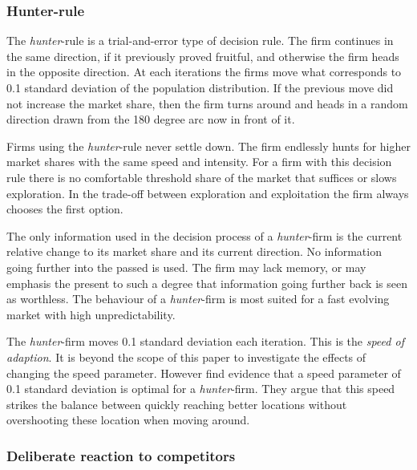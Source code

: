 \documentclass[preprint, 12pt]{elsarticle}
\begin{document}
\subsubsection{Hunter-rule}

The \emph{hunter}-rule is a trial-and-error type of decision rule. The firm continues in the same direction, if it previously proved fruitful, and otherwise the firm heads in the opposite direction. At each iterations the firms move what corresponds to 0.1 standard deviation of the population distribution. If the previous move did not increase the market share, then the firm turns around and heads in a random direction drawn from the 180 degree arc now in front of it. 

Firms using the \emph{hunter}-rule never settle down. The firm endlessly hunts for higher market shares with the same speed and intensity. For a firm with this decision rule there is no comfortable threshold share of the market that suffices or slows exploration. In the trade-off between exploration and exploitation the firm always chooses the first option. 

The only information used in the decision process of a \emph{hunter}-firm is the current relative change to its market share and its current direction. No information going further into the passed is used. The firm may lack memory, or may emphasis the present to such a degree that information going further back is seen as worthless. The behaviour of a \emph{hunter}-firm is most suited for a fast evolving market with high unpredictability.

The \emph{hunter}-firm moves 0.1 standard deviation each iteration. This is the \emph{speed of adaption}. It is beyond the scope of this paper to investigate the effects of changing the speed parameter. However \citet[chapter~7, pp.~150-151]{Laver_Sergenti_2011} find evidence that a speed parameter of 0.1 standard deviation is optimal for a \emph{hunter}-firm. They argue that this speed strikes the balance between quickly reaching better locations without overshooting these location when moving around. 

\subsubsection{Deliberate reaction to competitors}
\end{document}
